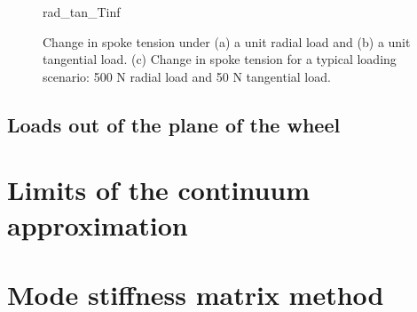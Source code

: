 \documentclass[../thesis.tex]{subfiles}
\begin{document}
\begin{figure}
\centering
{rad_tan_Tinf}
\caption{Change in spoke tension under (a) a unit radial load and (b) a unit tangential load. (c) Change in spoke tension for a typical loading scenario: 500 N radial load and 50 N tangential load.}
\label{fig:radtan_Tinf}
\end{figure}

\subsection{Loads out of the plane of the wheel}


\section{Limits of the continuum approximation}


\section{Mode stiffness matrix method}
\end{document}
